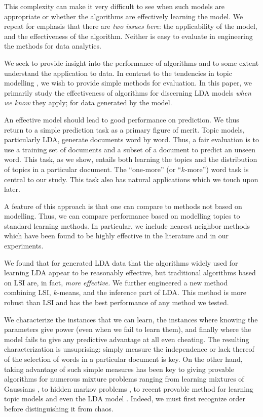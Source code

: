 This complexity can make it very difficult to see when such models are
appropriate or whether the algorithms are effectively learning the
model.  We repeat for emphasis that there are {\em two issues here}:
the applicability of the model, and the effectiveness of the
algorithm.  Neither is easy to evaluate in engineering the methods
for data analytics.

We seek to provide insight into the performance of algorithms and to
some extent understand the application to data.  In contrast to the
tendencies in topic modelling \cite{BleiCBA}, we wish to provide simple
methods for evaluation. In this paper, we primarily study the
effectiveness of algorithms for discerning LDA models {\em when we
know} they apply; for data generated by the model.


An effective model should lead to good performance on prediction. We
thus return to a simple prediction task as a primary figure of merit.
Topic models, particularly LDA, generate documents word by word.
Thus, a fair evaluation is to use a training set of documents and a
subset of a document to predict an unseen word.  This task, as we
show, entails both learning the topics and the distribution of topics
in a particular document.  The ``one-more'' (or ``$k$-more'') word
task is central to our study.  This task also has natural
applications which we touch upon later.

A feature of this approach is that one can compare to methods not
based on modelling.  Thus, we can compare performance based on
modelling topics to standard learning methods.  In particular, we
include nearest neighbor methods which have been found to be highly
effective in the literature and in our experiments.

We found that for generated LDA data that the algorithms widely used for
learning LDA appear to be reasonably effective, but traditional
algorithms based on LSI are, in fact, {\em more effective.}  We
further engineered a new method combining LSI, $k$-means, and the
inference part of LDA.  This method is more robust than
LSI and has the best performance of any method we tested.

We characterize the instances that we can learn, the instances where
knowing the parameters give power (even when we fail to learn them),
and finally where the model fails to give any predictive advantage at
all even cheating.  The resulting characterization is unsuprising:
simply measure the independence or lack thereof of the selection of
words in a particular document is key.  On the other hand, taking
advantage of such simple measures has been key to giving provable
algorithms for numerous mixture problems ranging from learning
mixtures of Gaussians \cite{VempalaW04}, to hidden markov problems
\cite{MosselRoch}, to recent provable method for learning topic models
\cite{Arora2012} and even the LDA model \cite{AnandLDA}.  Indeed, we must
first recognize order before distinguishing it from chaos.


